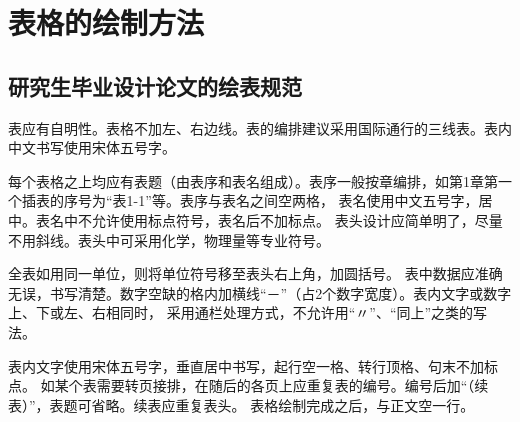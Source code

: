 \chapter{表格的绘制方法}
\section{研究生毕业设计论文的绘表规范}
表应有自明性。表格不加左、右边线。表的编排建议采用国际通行的三线表。表内中文书写使用宋体五号字。

每个表格之上均应有表题（由表序和表名组成）。表序一般按章编排，如第1章第一个插表的序号为“表1-1”等。表序与表名之间空两格，
表名使用中文五号字，居中。表名中不允许使用标点符号，表名后不加标点。
表头设计应简单明了，尽量不用斜线。表头中可采用化学，物理量等专业符号。

全表如用同一单位，则将单位符号移至表头右上角，加圆括号。
表中数据应准确无误，书写清楚。数字空缺的格内加横线“－”（占2个数字宽度）。表内文字或数字上、下或左、右相同时，
采用通栏处理方式，不允许用“〃”、“同上”之类的写法。

表内文字使用宋体五号字，垂直居中书写，起行空一格、转行顶格、句末不加标点。
如某个表需要转页接排，在随后的各页上应重复表的编号。编号后加“（续表）”，表题可省略。续表应重复表头。
表格绘制完成之后，与正文空一行。

